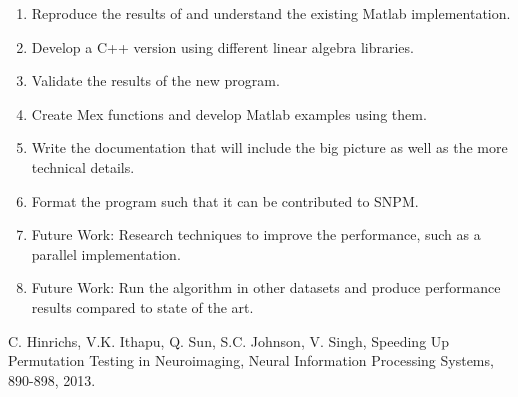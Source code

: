\documentclass[10pt,letterpaper]{article}
\begin{document}
\begin{enumerate}
  \item Reproduce the results of \cite{vamsi} and understand the existing Matlab implementation.
  \item Develop a C++ version using different linear algebra libraries.
  \item Validate the results of the new program.
  \item Create Mex functions and develop Matlab examples using them.
  \item Write the documentation that will include the big picture as well as the more technical details.
  \item Format the program such that it can be contributed to SNPM.
  \item Future Work: Research techniques to improve the performance, such as a parallel implementation. 
  \item Future Work: Run the algorithm in other datasets and produce performance results compared to state of the art.
 
\end{enumerate}



\clearpage

{\small
\begin{thebibliography}{9}

  C. Hinrichs, V.K. Ithapu, Q. Sun, S.C. Johnson, V. Singh,
  Speeding Up Permutation Testing in Neuroimaging, 
  Neural Information Processing Systems, 
  890-898, 
  2013.


\end{thebibliography}
}
\end{document}

